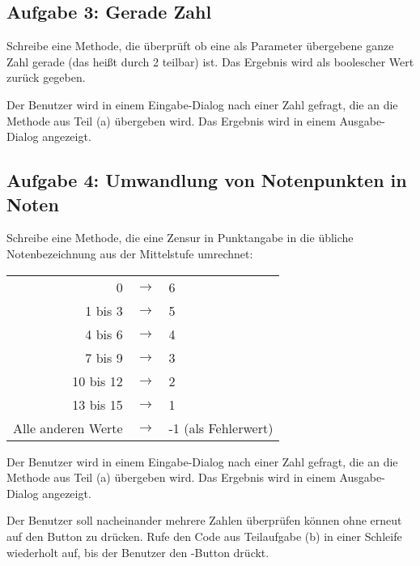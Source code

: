 \subsection{Aufgabe 3: Gerade Zahl}

\begin{compactenum}[a)]
\item Schreibe eine Methode, die überprüft ob eine als Parameter übergebene
ganze Zahl gerade (das heißt durch 2 teilbar) ist. Das Ergebnis wird als
boolescher Wert zurück gegeben.

\item Der Benutzer wird in einem Eingabe-Dialog nach einer Zahl gefragt, die an
die Methode aus Teil (a) übergeben wird. Das Ergebnis wird in einem
Ausgabe-Dialog angezeigt.
\end{compactenum}


\subsection{Aufgabe 4: Umwandlung von Notenpunkten in Noten}

\begin{compactenum}[a)]

\item Schreibe eine Methode, die eine Zensur in Punktangabe in die übliche
 Notenbezeichnung aus der Mittelstufe umrechnet:

\begin{tabular}{rcl}
0 & $\rightarrow$ & 6 \\
1 bis 3 & $\rightarrow$ & 5\\
4 bis 6 & $\rightarrow$ & 4\\
7 bis 9 & $\rightarrow$ & 3\\
10 bis 12 & $\rightarrow$ & 2\\
13 bis 15 & $\rightarrow$ & 1\\
Alle anderen Werte & $\rightarrow$ & -1 (als Fehlerwert)\\
\end{tabular}

\item Der Benutzer wird in einem Eingabe-Dialog nach einer Zahl gefragt, die an
die Methode aus Teil (a) übergeben wird. Das Ergebnis wird in einem Ausgabe-Dialog angezeigt.

\item Der Benutzer soll nacheinander mehrere Zahlen überprüfen können ohne
erneut auf den Button zu drücken. Rufe den Code aus Teilaufgabe (b) in einer
Schleife wiederholt auf, bis der Benutzer den -Button drückt.
\end{compactenum}


